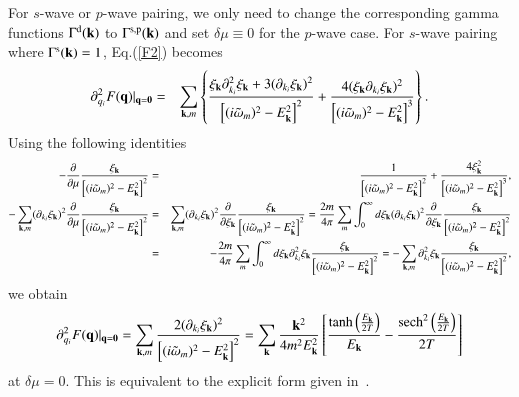 \documentclass[aps,prd,amsmath,two column,nofootinbib,amssymb,referee]{revtex4}
\begin{document}
\begin{widetext}
For $s$-wave or $p$-wave pairing, we only need to change the corresponding gamma functions $\Gamma^{\rm d}({\bf k})$ to $\Gamma^{\rm s,p}({\bf k})$ and set $\delta\mu\equiv0$ for the $p$-wave case. 
For $s$-wave pairing where $\Gamma^{\rm s}({\bf k})=1$,   Eq.(\ref{F2}) becomes
\begin{eqnarray}
\partial_{q_i}^2F({\bf q})|_{\bf q=0}&=&\sum_{{\bf k},m}\left\{{\xi_{\bf k}\partial_{k_i}^2\xi_{\bf k}+3(\partial_{k_i}\xi_{\bf k})^2\over\Big[(i\tilde\omega_m)^2-E_{\bf k}^2\Big]^2}+{4(\xi_{\bf k}\partial_{k_i}\xi_{\bf k})^2\over\Big[(i\tilde\omega_m)^2-E_{\bf k}^2\Big]^3}\right\}.
\end{eqnarray}
Using the following identities
\begin{eqnarray}
-{\partial\over\partial\mu}{\xi_{\bf k}\over\Big[(i\tilde\omega_m)^2-E_{\bf k}^2\Big]^2}&=&{1\over\Big[(i\tilde\omega_m)^2-E_{\bf k}^2\Big]^2}+{4\xi_{\bf k}^2\over\Big[(i\tilde\omega_m)^2-E_{\bf k}^2\Big]^3},\\
-\sum_{{\bf k},m}(\partial_{k_i}\xi_{\bf k})^2{\partial\over\partial\mu}{\xi_{\bf k}\over\Big[(i\tilde\omega_m)^2-E_{\bf k}^2\Big]^2}&=&\sum_{{\bf k},m}(\partial_{k_i}\xi_{\bf k})^2{\partial\over\partial\xi_{\bf k}}{\xi_{\bf k}\over\Big[(i\tilde\omega_m)^2-E_{\bf k}^2\Big]^2}={2m\over4\pi}\sum_m\int_0^\infty d\xi_{\bf k}(\partial_{k_i}\xi_{\bf k})^2{\partial\over\partial\xi_{\bf k}}{\xi_{\bf k}\over\Big[(i\tilde\omega_m)^2-E_{\bf k}^2\Big]^2}\nonumber\\
&=&-{2m\over4\pi}\sum_m\int_0^\infty d\xi_{\bf k}\partial_{k_i}^2\xi_{\bf k}{\xi_{\bf k}\over\Big[(i\tilde\omega_m)^2-E_{\bf k}^2\Big]^2}=-\sum_{{\bf k},m}\partial_{k_i}^2\xi_{\bf k}{\xi_{\bf k}\over\Big[(i\tilde\omega_m)^2-E_{\bf k}^2\Big]^2},
\end{eqnarray}
we obtain
\begin{eqnarray}
\partial_{q_i}^2F({\bf q})|_{\bf q=0}=\sum_{{\bf k},m}{2(\partial_{k_i}\xi_{\bf k})^2\over\Big[(i\tilde\omega_m)^2-E_{\bf k}^2\Big]^2}=\sum_{{\bf k}}{{\bf k}^2\over 4m^2E_{\bf k}^2}\left[{\tanh\left({E_{\bf k}\over2T}\right)\over E_{\bf k}}-{{\rm sech}^2\left({E_{\bf k}\over2T}\right)\over2T}\right]
\end{eqnarray}
at $\delta\mu=0$. This is equivalent to the explicit form given in~\cite{Botelho2006}.
\end{widetext}
\end{document}
